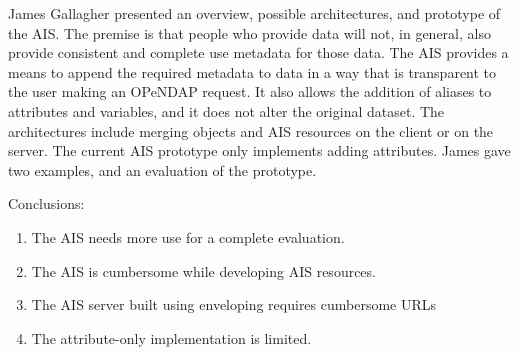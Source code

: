 James Gallagher presented an overview, possible architectures,
and prototype of the \ac{AIS}.  The premise is that people who
provide data will not, in general, also provide consistent and 
complete use metadata for those data.  The \ac{AIS} provides
a means to append the required metadata to data in a way 
that is transparent to the user making an OPeNDAP request.  
It also allows the addition of aliases to attributes and variables,
and it does not alter the original dataset.  The architectures
include merging objects and \ac{AIS} resources on the client 
or on the server.  The current \ac{AIS} prototype only implements
adding attributes.  James gave two examples, and an evaluation
of the prototype.

Conclusions:
\begin{enumerate}
  \item The \ac{AIS} needs more use for a complete evaluation.
  \item The \ac{AIS} is cumbersome while developing \ac{AIS} resources.
  \item The \ac{AIS} server built using enveloping requires cumbersome URLs
  \item The attribute-only implementation is limited.
\end{enumerate}

%
%
%
%

